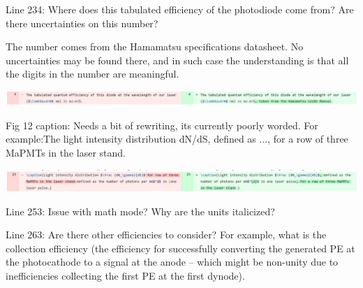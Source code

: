 \documentclass[11pt]{report}
\begin{document}
\begin{tcolorbox}[enlarge top by=2em,colbacktitle=black!60!white,colframe=black!80!white,left=0pt,right=0pt,top=0pt,bottom=0pt,boxrule=0.3pt,title=\bfseries1.03]
Line 234:  Where does this tabulated efficiency of the photodiode come from?  Are there uncertainties on this number?
\end{tcolorbox}

The number comes from the Hamamatsu specifications datasheet. No uncertainties may be found there, and in such case the understanding is that all the digits in the number are meaningful.


\includegraphics[width=\linewidth]{round1/1.03.png}

\begin{tcolorbox}[enlarge top by=2em,colbacktitle=black!60!white,colframe=black!80!white,left=0pt,right=0pt,top=0pt,bottom=0pt,boxrule=0.3pt,title=\bfseries1.04]
Fig  12  caption:  Needs  a  bit  of  rewriting,  its  currently  poorly  worded.   For  example:The light intensity distribution dN/dS, defined as ..., for a row of three MaPMTs in the laser stand.
\end{tcolorbox}


\includegraphics[width=\linewidth]{round1/1.04.png}

\begin{tcolorbox}[enlarge top by=2em,colbacktitle=black!60!white,colframe=black!80!white,left=0pt,right=0pt,top=0pt,bottom=0pt,boxrule=0.3pt,title=\bfseries1.05]
Line 253:  Issue with math mode?  Why are the units italicized?
\end{tcolorbox}


\begin{tcolorbox}[enlarge top by=2em,colbacktitle=black!60!white,colframe=black!80!white,left=0pt,right=0pt,top=0pt,bottom=0pt,boxrule=0.3pt,title=\bfseries1.06]
Line 263:  Are there other efficiencies to consider?  For example, what is the collection efficiency (the  efficiency  for  successfully  converting  the  generated  PE  at  the  photocathode  to  a  signal  at  the anode – which might be non-unity due to inefficiencies collecting the first PE at the first dynode).
\end{tcolorbox}
\end{document}
